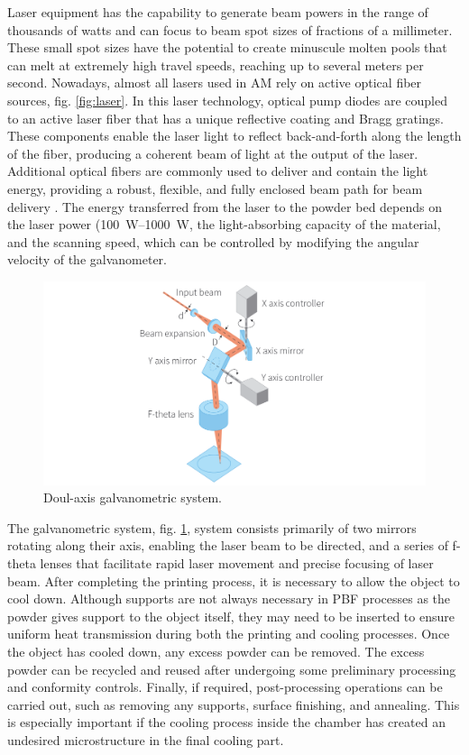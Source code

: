 Laser equipment has the capability to generate beam powers in the range of thousands of watts and can focus to beam spot sizes of fractions of a millimeter. These small spot sizes have the potential to create minuscule molten pools that can melt at extremely high travel speeds, reaching up to several meters per second. Nowadays, almost all lasers used in AM rely on active optical fiber sources, fig. \ref{fig:laser}. In this laser technology, optical pump diodes are coupled to an active laser fiber that has a unique reflective coating and Bragg gratings. These components enable the laser light to reflect back-and-forth along the length of the fiber, producing a coherent beam of light at the output of the laser. Additional optical fibers are commonly used to deliver and contain the light energy, providing a robust, flexible, and fully enclosed beam path for beam delivery \cite{milewski_additive_2017}. The energy transferred from the laser to the powder bed depends on the laser power (\SIrange[range-phrase = --]{100}{1000}{\watt}, the light-absorbing capacity of the material, and the scanning speed, which can be controlled by modifying the angular velocity of the galvanometer.

\begin{figure}[H]
    \centering
    \includegraphics[scale=0.5]{Images/galvanometro.png}
    \caption[Galvanometric system.]{Doul-axis galvanometric system.}
    \label{fig:galvano}
\end{figure}
The galvanometric system, fig. \ref{fig:galvano}, system consists primarily of two mirrors rotating along their axis, enabling the laser beam to be directed, and a series of f-theta lenses that facilitate rapid laser movement and precise focusing of laser beam. After completing the printing process, it is necessary to allow the object to cool down. Although supports are not always necessary in PBF processes as the powder gives support to the object itself, they may need to be inserted to ensure uniform heat transmission during both the printing and cooling processes. Once the object has cooled down, any excess powder can be removed. The excess powder can be recycled and reused after undergoing some preliminary processing and conformity controls. Finally, if required, post-processing operations can be carried out, such as removing any supports, surface finishing, and annealing. This is especially important if the cooling process inside the chamber has created an undesired microstructure in the final cooling part.




